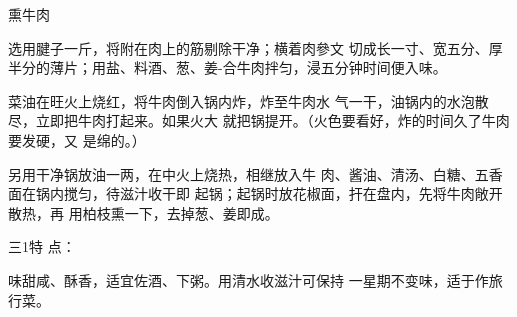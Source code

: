 \begin{recipe}{熏牛肉}

\ingredients



\cooking

\step 	选用腱子一斤，将附在肉上的筋剔除干净；横着肉參文 切成长一寸、宽五分、厚半分的薄片；用盐、料酒、葱、姜-合牛肉拌匀，浸五分钟时间便入味。

\step 	菜油在旺火上烧红，将牛肉倒入锅内炸，炸至牛肉水 气一干，油锅内的水泡散尽，立即把牛肉打起来。如果火大 就把锅提开。（火色要看好，炸的时间久了牛肉要发硬，又 是绵的。）

\step 	另用干净锅放油一两，在中火上烧热，相继放入牛 肉、酱油、清汤、白糖、五香面在锅内搅匀，待滋汁收干即 起锅；起锅时放花椒面，扞在盘内，先将牛肉敞开散热，再 用柏枝熏一下，去掉葱、姜即成。

三1特 点：

味甜咸、酥香，适宜佐酒、下粥。用清水收滋汁可保持 一星期不变味，适于作旅行菜。

\end{recipe}

